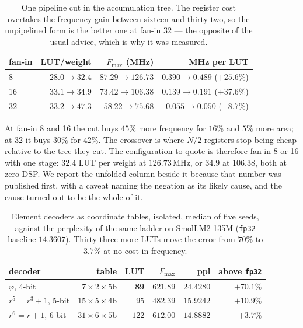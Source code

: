 \begin{table}[t]\centering
\caption{One pipeline cut in the accumulation tree. The register cost overtakes
the frequency gain between sixteen and thirty-two, so the unpipelined form is
the better one at fan-in 32 --- the opposite of the usual advice, which is why it
was measured.}
\label{tab:nodepipe}
\begin{tabular}{lrrr}
\toprule
fan-in & LUT/weight & $F_{\max}$ (MHz) & MHz per LUT \\
\midrule
8  & $28.0\to\mathbf{32.4}$ & $87.29\to\mathbf{126.73}$ & $0.390\to0.489$ (\textbf{$+25.6\%$}) \\
16 & $33.1\to\mathbf{34.9}$ & $73.42\to\mathbf{106.38}$ & $0.139\to0.191$ (\textbf{$+37.6\%$}) \\
32 & $33.2\to47.3$ & $58.22\to75.68$ & $0.055\to0.050$ ($-8.7\%$) \\
\bottomrule
\end{tabular}
\end{table}

At fan-in 8 and 16 the cut buys $45\%$ more frequency for $16\%$ and $5\%$ more
area; at 32 it buys $30\%$ for $42\%$. The crossover is where $N/2$ registers
stop being cheap relative to the tree they cut. The configuration to quote is
therefore fan-in 8 or 16 with one stage: $32.4$ LUT per weight at $126.73$\,MHz,
or $34.9$ at $106.38$, both at zero DSP. We report the unfolded column beside it because that number was
published first, with a caveat naming the negation as its likely cause, and the
cause turned out to be the whole of it.

\begin{table}[t]\centering
\caption{Element decoders as coordinate tables, isolated, median of five seeds,
against the perplexity of the same ladder on SmolLM2-135M
(\texttt{fp32} baseline $14.3607$). Thirty-three more LUTs move the error from
$70\%$ to $3.7\%$ at no cost in frequency.}
\label{tab:elemsil}
\begin{tabular}{lrrrrr}
\toprule
decoder & table & LUT & $F_{\max}$ & ppl & above \texttt{fp32} \\
\midrule
$\varphi$, 4-bit          & $7\times2\times5$b  & \textbf{89} & $621.89$ & $24.4280$ & $+70.1\%$ \\
$r^5{=}r^3{+}1$, 5-bit    & $15\times5\times4$b & $95$ & $482.39$ & $15.9242$ & $+10.9\%$ \\
$r^6{=}r{+}1$, 6-bit      & $31\times6\times5$b & $122$ & $612.00$ & $\mathbf{14.8882}$ & $\mathbf{+3.7\%}$ \\
\bottomrule
\end{tabular}
\end{table}


